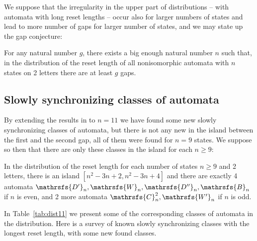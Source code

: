 \documentclass[runningheads,a4paper]{llncs}
\newcommand{\<}{\langle}
\renewcommand{\>}{\rangle}
\begin{document}
We suppose that the irregularity in the upper part of distributions -- with automata with long reset lengths -- occur also for larger numbers of states and lead to more number of gaps for larger number of states, and we may state up the gap conjecture:
\begin{conjecture}
For any natural number $g$, there exists a big enough natural number $n$ such that, in the distribution of the reset length of all nonisomorphic automata with $n$ states on 2 letters there are at least $g$ gaps.
\end{conjecture}

\subsection{Slowly synchronizing classes of automata}

By extending the results in \cite{AGV2010} to $n=11$ we have found some new slowly synchronizing classes of automata, but there is not any new in the island between the first and the second gap, all of them were found for $n=9$ states. We suppose so then that there are only these classes in the island for each $n \ge 9$:
\begin{conjecture}
In the distribution of the reset length for each number of states $n \ge 9$ and 2 letters, there is an island $[n^2-3n+2,n^2-3n+4]$ and there are exactly 4 automata $\mathrsfs{D'}_n,\mathrsfs{W}_n,\mathrsfs{D''}_n,\mathrsfs{B}_n$ if $n$ is even, and 2 more automata $\mathrsfs{C}^2_n,\mathrsfs{W'}_n$ if $n$ is odd.
\end{conjecture}

In Table~\ref{tab:dist11} we present some of the corresponding classes of automata in the distribution. Here is a survey of known slowly synchronizing classes with the longest reset length, with some new found classes.
\end{document}
